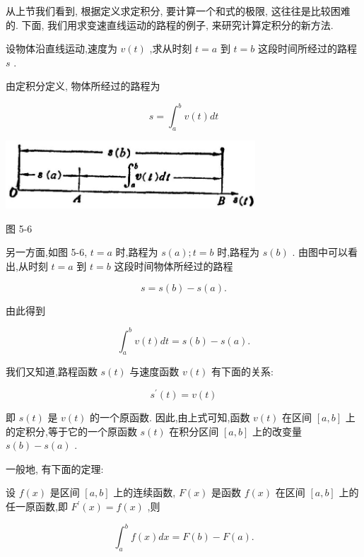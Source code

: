 \documentclass[lang=cn,newtx,10pt,scheme=chinese]{elegantbook}
\begin{document}
从上节我们看到, 根据定义求定积分, 要计算一个和式的极限, 这往往是比较困难的. 下面, 我们用求变速直线运动的路程的例子, 来研究计算定积分的新方法.

设物体沿直线运动,速度为 \(v\left( t\right)\) ,求从时刻 \(t = a\) 到 \(t = b\) 这段时间所经过的路程 \(s\) .

由定积分定义, 物体所经过的路程为

\[
s = {\int }_{a}^{b}v\left( t\right) {dt}
\]

\begin{center}
\includegraphics[max width=0.7\textwidth]{images/01912c18-5c3f-733d-b775-749ba9897a9d_225_134815.jpg}
\end{center}

图 5-6

另一方面,如图 5-6, \(t = a\) 时,路程为 \(s\left( a\right) ;t = b\) 时,路程为 \(s\left( b\right)\) . 由图中可以看出,从时刻 \(t = a\) 到 \(t = b\) 这段时间物体所经过的路程

\[
s = s\left( b\right) - s\left( a\right) .
\]

由此得到

\[
{\int }_{a}^{b}v\left( t\right) {dt} = s\left( b\right) - s\left( a\right) .
\]

我们又知道,路程函数 \(s\left( t\right)\) 与速度函数 \(v\left( t\right)\) 有下面的关系:

\[
{s}^{\prime }\left( t\right) = v\left( t\right)
\]

即 \(s\left( t\right)\) 是 \(v\left( t\right)\) 的一个原函数. 因此,由上式可知,函数 \(v\left( t\right)\) 在区间 \(\left\lbrack {a,b}\right\rbrack\) 上的定积分,等于它的一个原函数 \(s\left( t\right)\) 在积分区间 \(\left\lbrack {a,b}\right\rbrack\) 上的改变量 \(s\left( b\right) - s\left( a\right)\) .

一般地, 有下面的定理:

\begin{theorem}[定理]

设 \(f\left( x\right)\) 是区间 \(\left\lbrack {a,b}\right\rbrack\) 上的连续函数, \(F\left( x\right)\) 是函数 \(f\left( x\right)\) 在区间 \(\left\lbrack {a,b}\right\rbrack\) 上的任一原函数,即 \({F}^{\prime }\left( x\right) = f\left( x\right)\) ,则

\[
{\int }_{a}^{b}f\left( x\right) {dx} = F\left( b\right) - F\left( a\right) .
\]

\end{theorem}
\end{document}
